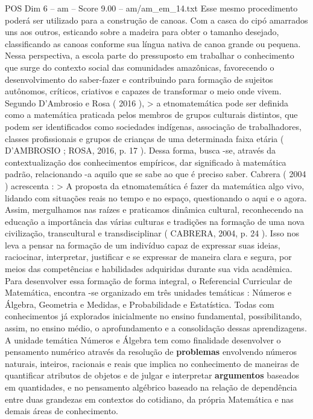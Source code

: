 \begin{textsample}{POS Dim 6 – am – Score 9.00 – am/am\_em\_14.txt}
Esse mesmo procedimento poderá ser utilizado para a construção de canoas.
Com a casca do cipó amarrados uns aos outros, esticando sobre a madeira para obter o tamanho desejado, classificando as canoas conforme sua língua nativa de canoa grande ou pequena.
Nessa perspectiva, a escola parte do pressuposto em trabalhar o conhecimento que surge do contexto social das comunidades amazônicas, favorecendo o desenvolvimento do saber-fazer e contribuindo para formação de sujeitos autônomos, críticos, criativos e capazes de transformar o meio onde vivem.
Segundo D'Ambrosio e Rosa ( 2016 ), > a etnomatemática pode ser definida como a matemática praticada pelos membros de grupos culturais distintos, que podem ser identificados como sociedades indígenas, associação de trabalhadores, classes profissionais e grupos de crianças de uma determinada faixa etária ( D'AMBROSIO ; ROSA, 2016, p. 17 ).
Dessa forma, busca -se, através da contextualização dos conhecimentos empíricos, dar significado à matemática padrão, relacionando -a aquilo que se sabe ao que é preciso saber.
Cabrera ( 2004 ) acrescenta : > A proposta da etnomatemática é fazer da matemática algo vivo, lidando com situações reais no tempo e no espaço, questionando o aqui e o agora.
Assim, mergulhamos nas raízes e praticamos dinâmica cultural, reconhecendo na educação a importância das várias culturas e tradições na formação de uma nova civilização, transcultural e transdisciplinar ( CABRERA, 2004, p. 24 ).
Isso nos leva a pensar na formação de um indivíduo capaz de expressar suas ideias, raciocinar, interpretar, justificar e se expressar de maneira clara e segura, por meios das competências e habilidades adquiridas durante sua vida acadêmica.
Para desenvolver essa formação de forma integral, o Referencial Curricular de Matemática, encontra -se organizado em três unidades temáticas : Números e Álgebra, Geometria e Medidas, e Probabilidade e Estatística.
Todas com conhecimentos já explorados inicialmente no ensino fundamental, possibilitando, assim, no ensino médio, o aprofundamento e a consolidação dessas aprendizagens.
A unidade temática Números e Álgebra tem como finalidade desenvolver o pensamento numérico através da resolução de \textbf{problemas} envolvendo números naturais, inteiros, racionais e reais que implica no conhecimento de maneiras de quantificar atributos de objetos e de julgar e interpretar \textbf{argumentos} baseados em quantidades, e no pensamento algébrico baseado na relação de dependência entre duas grandezas em contextos do cotidiano, da própria Matemática e nas demais áreas de conhecimento.

\end{textsample}
